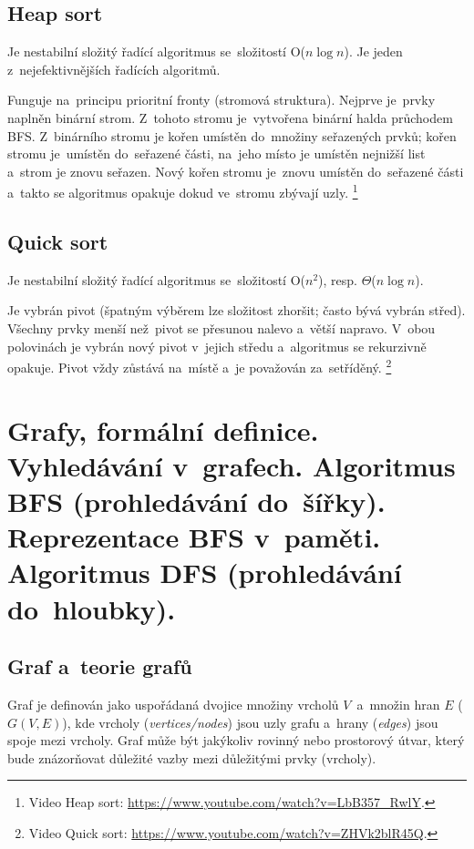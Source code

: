 \subsection{Heap sort}

Je nestabilní složitý řadící algoritmus se~složitostí O(\( n\log{n} \)). Je jeden z~nejefektivnějších řadících algoritmů.

Funguje na~principu prioritní fronty (stromová struktura). Nejprve je~prvky naplněn binární strom. Z~tohoto stromu je~vytvořena binární halda průchodem BFS. Z~binárního stromu je kořen umístěn do~množiny seřazených prvků; kořen stromu je~umístěn do~seřazené části, na~jeho místo je umístěn nejnižší list a~strom je znovu seřazen. Nový kořen stromu je~znovu umístěn do~seřazené části a~takto se algoritmus opakuje dokud ve~stromu zbývají uzly.%
\footnote{Video Heap sort: \url{https://www.youtube.com/watch?v=LbB357_RwlY}.}

\subsection{Quick sort}

Je nestabilní složitý řadící algoritmus se~složitostí O(\( n^2 \)), resp. \( \Theta \)(\( n\log{n} \)).

Je vybrán pivot (špatným výběrem lze složitost zhoršit; často bývá vybrán střed). Všechny prvky menší než~pivot se přesunou nalevo a~větší napravo. V~obou polovinách je vybrán nový pivot v~jejich středu a~algoritmus se rekurzivně opakuje. Pivot vždy zůstává na~místě a~je považován za~setříděný.%
\footnote{Video Quick sort: \url{https://www.youtube.com/watch?v=ZHVk2blR45Q}.}

\clearpage
\section{Grafy, formální definice. Vyhledávání v~grafech. Algoritmus BFS (prohledávání do~šířky). Reprezentace BFS v~paměti. Algoritmus DFS (prohledávání do~hloubky).}

\subsection{Graf a~teorie grafů}

Graf je definován jako uspořádaná dvojice množiny vrcholů \( V \)~a~množin hran \( E \) (\( G(V,E) \)), kde vrcholy (\emph{vertices/nodes}) jsou uzly grafu a~hrany (\emph{edges}) jsou spoje mezi vrcholy. Graf může být jakýkoliv rovinný nebo prostorový útvar, který bude znázorňovat důležité vazby mezi důležitými prvky (vrcholy).

